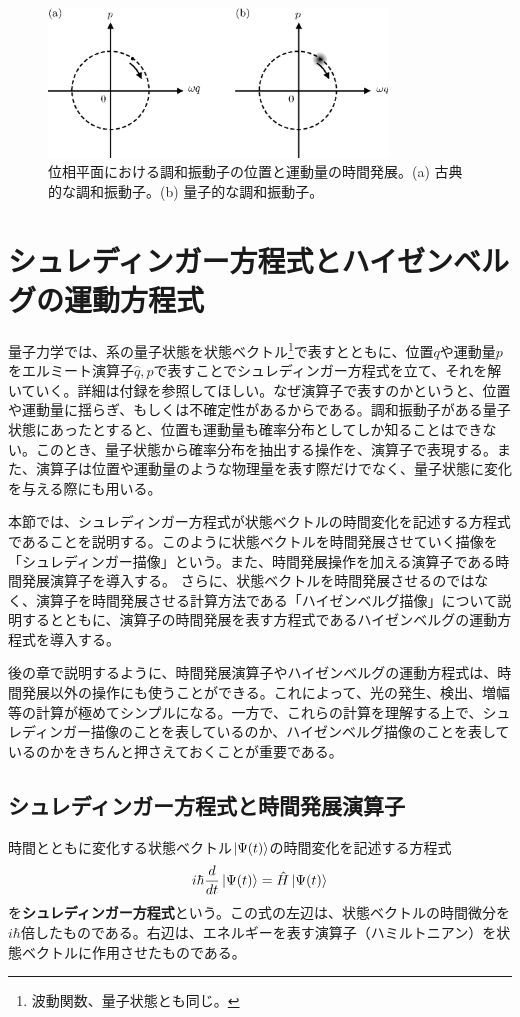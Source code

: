 \begin{figure}
  \centering
  \includegraphics[width=9cm]{fig/2-1_phase_space.eps} 
  \caption{位相平面における調和振動子の位置と運動量の時間発展。(a) 古典的な調和振動子。(b) 量子的な調和振動子。}
  \label{fig:classical_phase_space}
\end{figure}


\section{シュレディンガー方程式とハイゼンベルグの運動方程式}
量子力学では、系の量子状態を状態ベクトル\footnote{波動関数、量子状態とも同じ。}で表すとともに、位置$q$や運動量$p$をエルミート演算子$\hat q, \hat p$で表すことでシュレディンガー方程式を立て、それを解いていく。詳細は付録を参照してほしい。なぜ演算子で表すのかというと、位置や運動量に揺らぎ、もしくは不確定性があるからである。調和振動子がある量子状態にあったとすると、位置も運動量も確率分布としてしか知ることはできない。このとき、量子状態から確率分布を抽出する操作を、演算子で表現する。また、演算子は位置や運動量のような物理量を表す際だけでなく、量子状態に変化を与える際にも用いる。

本節では、シュレディンガー方程式が状態ベクトルの時間変化を記述する方程式であることを説明する。このように状態ベクトルを時間発展させていく描像を「シュレディンガー描像」という。また、時間発展操作を加える演算子である時間発展演算子を導入する。
さらに、状態ベクトルを時間発展させるのではなく、演算子を時間発展させる計算方法である「ハイゼンベルグ描像」について説明するとともに、演算子の時間発展を表す方程式であるハイゼンベルグの運動方程式を導入する。

後の章で説明するように、時間発展演算子やハイゼンベルグの運動方程式は、時間発展以外の操作にも使うことができる。これによって、光の発生、検出、増幅等の計算が極めてシンプルになる。一方で、これらの計算を理解する上で、シュレディンガー描像のことを表しているのか、ハイゼンベルグ描像のことを表しているのかをきちんと押さえておくことが重要である。

\subsection{シュレディンガー方程式と時間発展演算子}
時間とともに変化する状態ベクトル$\ket{\Psi(t)}$の時間変化を記述する方程式
\begin{equation}
  i\hbar \frac{d}{dt}\ket{\Psi(t)} = \hat H \ket{\Psi(t)}
  \label{eq:Schrodinger_equation}
\end{equation}
を\textbf{シュレディンガー方程式}という。この式の左辺は、状態ベクトルの時間微分を$i\hbar$倍したものである。右辺は、エネルギーを表す演算子（ハミルトニアン）を状態ベクトルに作用させたものである。

